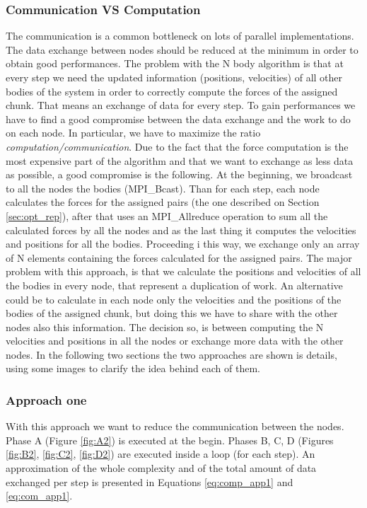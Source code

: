 \documentclass[a4paper]{article}
\begin{document}
\subsubsection{Communication VS Computation}
\label{sec:comm_comp}
The communication is a common bottleneck on lots of parallel implementations. The data exchange between nodes should be reduced at the minimum in order to obtain good performances. The problem with the N body algorithm is that at every step we need the updated information (positions, velocities) of all other bodies of the system in order to correctly compute the forces of the assigned chunk. That means an exchange of data for every step. To gain performances we have to find a good compromise between the data exchange and the work to do on each node. In particular, we have to maximize the ratio \textit{computation/communication}. Due to the fact that the force computation is the most expensive part of the algorithm and that we want to exchange as less data as possible, a good compromise is the following. At the beginning, we broadcast to all the nodes the bodies (MPI\_Bcast). Than for each step, each node calculates the forces for the assigned pairs (the one described on Section \ref{sec:opt_rep}), after that uses an MPI\_Allreduce operation to sum all the calculated forces by all the nodes and as the last thing it computes the velocities and positions for all the bodies. Proceeding i this way, we exchange only an array of N elements containing the forces calculated for the assigned pairs. The major problem with this approach, is that we calculate the positions and velocities of all the bodies in every node, that represent a duplication of work. An alternative could be to calculate in each node only the velocities and the positions of the bodies of the assigned chunk, but doing this we have to share with the other nodes also this information. The decision so, is between computing the N velocities and positions in all the nodes or exchange more data with the other nodes. In the following two sections the two approaches are shown is details, using some images to clarify the idea behind each of them.

\subsubsection{Approach one}
\label{sec:app_1}

With this approach we want to reduce the communication between the nodes. 
Phase A (Figure \ref{fig:A2}) is executed at the begin. Phases B, C, D (Figures \ref{fig:B2}, \ref{fig:C2}, \ref{fig:D2}) are executed inside a loop (for each step). An approximation of the whole complexity and of the total amount of data exchanged per step is presented in Equations \ref{eq:comp_app1} and \ref{eq:com_app1}.
\end{document}
